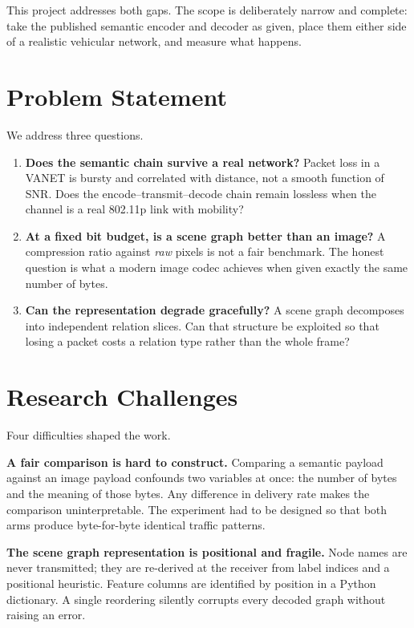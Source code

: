 \documentclass{iutbscthesis}
\begin{document}
This project addresses both gaps. The scope is deliberately narrow and
complete: take the published semantic encoder and decoder as given, place them
either side of a realistic vehicular network, and measure what happens.

\section{Problem Statement}

We address three questions.

\begin{enumerate}
    \item \textbf{Does the semantic chain survive a real network?} Packet loss
    in a VANET is bursty and correlated with distance, not a smooth function of
    SNR. Does the encode--transmit--decode chain remain lossless when the
    channel is a real 802.11p link with mobility?
    \item \textbf{At a fixed bit budget, is a scene graph better than an
    image?} A compression ratio against \emph{raw} pixels is not a fair
    benchmark. The honest question is what a modern image codec achieves when
    given exactly the same number of bytes.
    \item \textbf{Can the representation degrade gracefully?} A scene graph
    decomposes into independent relation slices. Can that structure be
    exploited so that losing a packet costs a relation type rather than the
    whole frame?
\end{enumerate}

\section{Research Challenges}

Four difficulties shaped the work.

\textbf{A fair comparison is hard to construct.} Comparing a semantic payload
against an image payload confounds two variables at once: the number of bytes
and the meaning of those bytes. Any difference in delivery rate makes the
comparison uninterpretable. The experiment had to be designed so that both
arms produce byte-for-byte identical traffic patterns.

\textbf{The scene graph representation is positional and fragile.} Node names
are never transmitted; they are re-derived at the receiver from label indices
and a positional heuristic. Feature columns are identified by position in a
Python dictionary. A single reordering silently corrupts every decoded graph
without raising an error.
\end{document}
